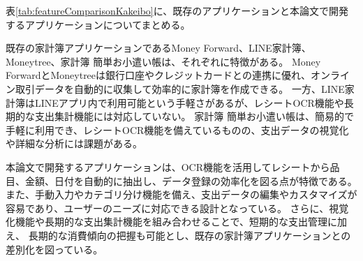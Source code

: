 \documentclass[main]{subfiles}
\begin{document}
表\ref{tab:featureComparisonKakeibo}に、既存のアプリケーションと本論文で開発するアプリケーションについてまとめる。



既存の家計簿アプリケーションであるMoney Forward、LINE家計簿、Moneytree、家計簿 簡単お小遣い帳は、それぞれに特徴がある。
Money ForwardとMoneytreeは銀行口座やクレジットカードとの連携に優れ、オンライン取引データを自動的に収集して効率的に家計簿を作成できる。
一方、LINE家計簿はLINEアプリ内で利用可能という手軽さがあるが、レシートOCR機能や長期的な支出集計機能には対応していない。
家計簿 簡単お小遣い帳は、簡易的で手軽に利用でき、レシートOCR機能を備えているものの、支出データの視覚化や詳細な分析には課題がある。



本論文で開発するアプリケーションは、OCR機能を活用してレシートから品目、金額、日付を自動的に抽出し、データ登録の効率化を図る点が特徴である。
また、手動入力やカテゴリ分け機能を備え、支出データの編集やカスタマイズが容易であり、ユーザーのニーズに対応できる設計となっている。
さらに、視覚化機能や長期的な支出集計機能を組み合わせることで、短期的な支出管理に加え、
長期的な消費傾向の把握も可能とし、既存の家計簿アプリケーションとの差別化を図っている。
\end{document}
